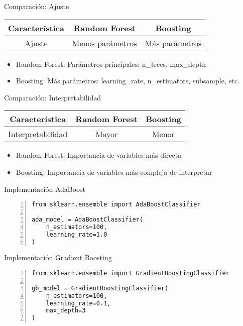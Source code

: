 \documentclass{beamer}
\begin{document}
\begin{frame}{Comparación: Ajuste}
    \begin{center}
    \begin{tabular}{|c|c|c|}
        \hline
        \textbf{Característica} & \textbf{Random Forest} & \textbf{Boosting} \\
        \hline
        Ajuste & Menos parámetros & Más parámetros \\
        \hline
    \end{tabular}
    \end{center}
    \begin{itemize}
        \item Random Forest: Parámetros principales: n\_trees, max\_depth
        \item Boosting: Más parámetros: learning\_rate, n\_estimators, subsample, etc.
    \end{itemize}
\end{frame}

\begin{frame}{Comparación: Interpretabilidad}
    \begin{center}
    \begin{tabular}{|c|c|c|}
        \hline
        \textbf{Característica} & \textbf{Random Forest} & \textbf{Boosting} \\
        \hline
        Interpretabilidad & Mayor & Menor \\
        \hline
    \end{tabular}
    \end{center}
    \begin{itemize}
        \item Random Forest: Importancia de variables más directa
        \item Boosting: Importancia de variables más compleja de interpretar
    \end{itemize}
\end{frame}

\begin{frame}[fragile]{Implementación AdaBoost}
    \begin{lstlisting}[numbers=left, numbersep=5pt]
from sklearn.ensemble import AdaBoostClassifier

ada_model = AdaBoostClassifier(
    n_estimators=100,
    learning_rate=1.0
)
    \end{lstlisting}
\end{frame}

\begin{frame}[fragile]{Implementación Gradient Boosting}
    \begin{lstlisting}[numbers=left, numbersep=5pt]
from sklearn.ensemble import GradientBoostingClassifier

gb_model = GradientBoostingClassifier(
    n_estimators=100,
    learning_rate=0.1,
    max_depth=3
)
    \end{lstlisting}
\end{frame}
\end{document}
